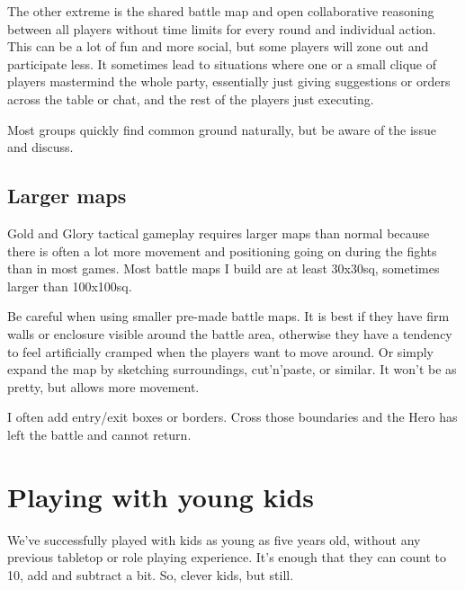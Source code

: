 The other extreme is the shared battle map and open collaborative reasoning between all players without time limits for every round and individual action. This can be a lot of fun and more social, but some players will zone out and participate less. It sometimes lead to situations where one or a small clique of players mastermind the whole party, essentially just giving suggestions or orders across the table or chat, and the rest of the players just executing.

Most groups quickly find common ground naturally, but be aware of the issue and discuss.




\subsection*{Larger maps}
Gold and Glory tactical gameplay requires larger maps than normal because there is often a lot more movement and positioning going on during the fights than in most games. Most battle maps I build are at least 30x30sq, sometimes larger than 100x100sq.

Be careful when using smaller pre-made battle maps. It is best if they have firm walls or enclosure visible around the battle area, otherwise they have a tendency to feel artificially cramped when the players want to move around. Or simply expand the map by sketching surroundings, cut'n'paste, or similar. It won't be as pretty, but allows more movement.

I often add entry/exit boxes or borders. Cross those boundaries and the Hero has left the battle and cannot return.











\section*{Playing with young kids}
\label{sec:youngkids}  %
We've successfully played with kids as young as five years old, without any previous tabletop or role playing experience. It's enough that they can count to 10, add and subtract a bit. So, clever kids, but still.

